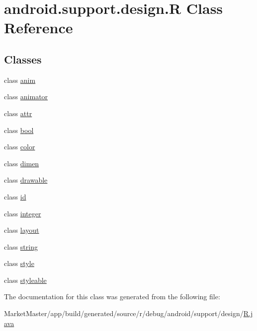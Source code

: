 \hypertarget{classandroid_1_1support_1_1design_1_1R}{}\section{android.\+support.\+design.\+R Class Reference}
\label{classandroid_1_1support_1_1design_1_1R}
\subsection*{Classes}
\begin{DoxyCompactItemize}
\item 
class \mbox{\hyperlink{classandroid_1_1support_1_1design_1_1R_1_1anim}{anim}}
\item 
class \mbox{\hyperlink{classandroid_1_1support_1_1design_1_1R_1_1animator}{animator}}
\item 
class \mbox{\hyperlink{classandroid_1_1support_1_1design_1_1R_1_1attr}{attr}}
\item 
class \mbox{\hyperlink{classandroid_1_1support_1_1design_1_1R_1_1bool}{bool}}
\item 
class \mbox{\hyperlink{classandroid_1_1support_1_1design_1_1R_1_1color}{color}}
\item 
class \mbox{\hyperlink{classandroid_1_1support_1_1design_1_1R_1_1dimen}{dimen}}
\item 
class \mbox{\hyperlink{classandroid_1_1support_1_1design_1_1R_1_1drawable}{drawable}}
\item 
class \mbox{\hyperlink{classandroid_1_1support_1_1design_1_1R_1_1id}{id}}
\item 
class \mbox{\hyperlink{classandroid_1_1support_1_1design_1_1R_1_1integer}{integer}}
\item 
class \mbox{\hyperlink{classandroid_1_1support_1_1design_1_1R_1_1layout}{layout}}
\item 
class \mbox{\hyperlink{classandroid_1_1support_1_1design_1_1R_1_1string}{string}}
\item 
class \mbox{\hyperlink{classandroid_1_1support_1_1design_1_1R_1_1style}{style}}
\item 
class \mbox{\hyperlink{classandroid_1_1support_1_1design_1_1R_1_1styleable}{styleable}}
\end{DoxyCompactItemize}


The documentation for this class was generated from the following file\+:\begin{DoxyCompactItemize}
\item 
Market\+Master/app/build/generated/source/r/debug/android/support/design/\mbox{\hyperlink{debug_2android_2support_2design_2R_8java}{R.\+java}}\end{DoxyCompactItemize}
